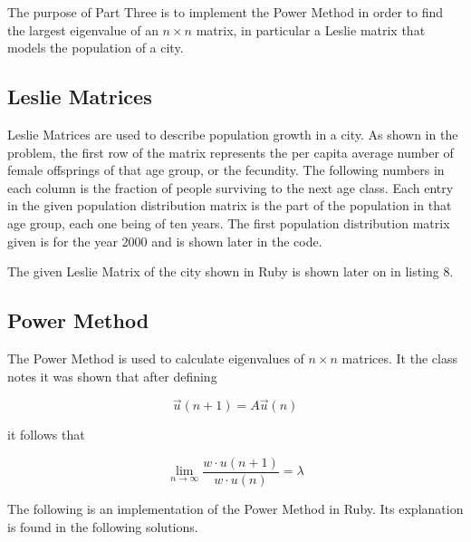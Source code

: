 \documentclass[letterpaper,12pt]{article}
\begin{document}

The purpose of Part Three is to implement the Power Method in order to find the
largest eigenvalue of an $n \times n$ matrix, in particular a Leslie matrix that
models the population of a city.

\subsection{Leslie Matrices}

Leslie Matrices are used to describe population growth in a city.
As shown in the problem, the first row of the matrix represents the per capita
average number of female offsprings of that age group, or the fecundity.
The following numbers in each column is the fraction of people surviving to the
next age class.
Each entry in the given population distribution matrix is the part of the
population in that age group, each one being of ten years.
The first population distribution matrix given is for the year 2000 and is shown
later in the code.

The given Leslie Matrix of the city shown in Ruby is shown later on in listing 8.

\subsection{Power Method}

The Power Method is used to calculate eigenvalues of $n \times n$ matrices.
It the class notes it was shown that after defining 

\[\vec{u}(n+1) = A\vec{u}(n)\]

it follows that

\[\lim_{n\to\infty} \frac{{w} \cdot {u(n+1)}}{ {w} \cdot {u(n)}} =\lambda\]

The following is an implementation of the Power Method in Ruby.
Its explanation is found in the following solutions.
\end{document}
